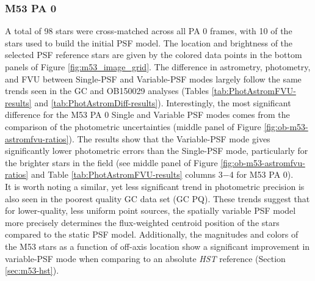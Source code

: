 \documentclass[]{spie}  %
\begin{document}
\subsubsection{M53 PA 0} \label{sec:result-m53-pa0}
A total of 98 stars were cross-matched across all PA 0 frames, with 10 of the stars used to build the initial PSF model. The location and brightness of the selected PSF reference stars are given by the colored data points in the bottom panels of Figure \ref{fig:m53_image_grid}. The difference in astrometry, photometry, and FVU between Single-PSF and Variable-PSF modes largely follow the same trends seen in the GC and OB150029 analyses (Tables \ref{tab:PhotAstromFVU-results} and \ref{tab:PhotAstromDiff-results}). Interestingly, the most significant difference for the M53 PA 0 Single and Variable PSF modes comes from the comparison of the photometric uncertainties (middle panel of Figure \ref{fig:ob-m53-astromfvu-ratios}). The results show that the Variable-PSF mode gives significantly lower photometric errors than the Single-PSF mode, particularly for the brighter stars in the field (see middle panel of Figure \ref{fig:ob-m53-astromfvu-ratios} and Table \ref{tab:PhotAstromFVU-results} columns 3$-$4 for M53 PA 0). \\
\indent It is worth noting a similar, yet less significant trend in photometric precision is also seen in the poorest quality GC data set (GC PQ). These trends suggest that for lower-quality, less uniform point sources, the spatially variable PSF model more precisely determines the flux-weighted centroid position of the stars compared to the static PSF model. Additionally, the magnitudes and colors of the M53 stars as a function of off-axis location show a significant improvement in variable-PSF mode when comparing to an absolute \textit{HST} reference (Section \ref{sec:m53-hst}).
\end{document}
